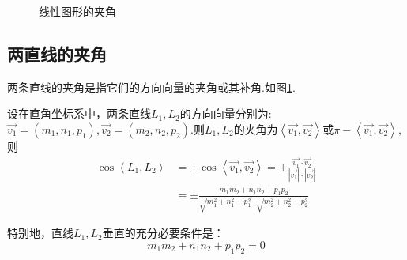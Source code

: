 \begin{figure}[h]
{\begin{minipage}[b]{0.2\linewidth}
			\label{两直线的夹角}
		\end{minipage}
	}
						\caption{线性图形的夹角}
\end{figure}
\subsection{两直线的夹角}
\quad 两条{\color{dy}直线的夹角}是指它们的方向向量的夹角或其补角.如图\ref{两直线的夹角}.

\theorem[两直线的夹角]
\quad 设在{\color{dy}直角坐标系}中，两条直线$L_1,L_2$的方向向量分别为:$\overrightarrow{v_1}=(m_1,n_1,p_1),\overrightarrow{v_2}=(m_2,n_2,p_2).$则$L_1,L_2$的夹角为$\left\langle \overrightarrow{v_1},\overrightarrow{v_2}\right\rangle $或$\pi -\left\langle \overrightarrow{v_1},\overrightarrow{v_2}\right\rangle ,$则
\begin{equation}
\begin{split}
\cos \left\langle L_1,L_2\right\rangle &=\pm \cos \left\langle \overrightarrow{v_1},\overrightarrow{v_2}\right\rangle =\pm \frac{\overrightarrow{v_1}\cdot \overrightarrow{v_2}}{|\overrightarrow{v_1}|\cdot |\overrightarrow{v_2}|}\\
&=\pm \frac{m_1m_2+n_1n_2+p_1p_2}{\sqrt{m_1^2+n_1^2+p_1^2}\cdot \sqrt{m_2^2+n_2^2+p_2^2}}
\end{split}
\end{equation}


特别地，直线$L_1,L_2$垂直的充分必要条件是：
\begin{equation}
m_1m_2+n_1n_2+p_1p_2=0
\end{equation}

